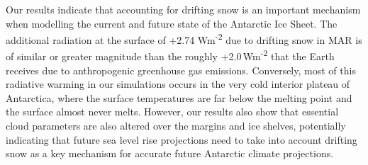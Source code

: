 \documentclass[draft]{agujournal2019}
\begin{document}
Our results indicate that accounting for drifting snow is an important mechanism when modelling the current and future state of the Antarctic Ice Sheet. The additional radiation at the surface of +2.74 Wm\textsuperscript{-2} due to drifting snow in MAR is of similar or greater magnitude than the roughly +2.0\,Wm\textsuperscript{-2} that the Earth receives due to anthropogenic greenhouse gas emissions. Conversely, most of this radiative warming in our simulations occurs in the very cold interior plateau of Antarctica, where the surface temperatures are far below the melting point and the surface almost never melts. However, our results also show that essential cloud parameters are also altered over the margins and ice shelves, potentially indicating that future sea level rise projections need to take into account drifting snow as a key mechanism for accurate future Antarctic climate projections.




%
%
%
%
%
%
%
%
%
%
\end{document}
